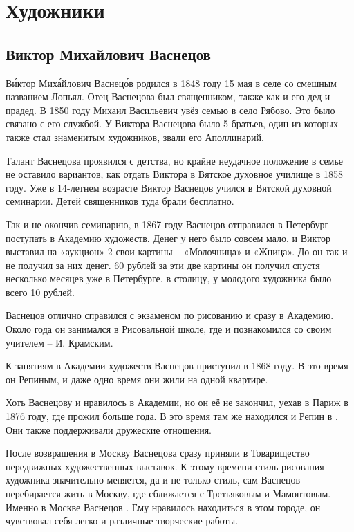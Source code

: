 \newpage
\section{Художники}
\subsection{Виктор Михайлович Васнецов}
В\'{и}ктор Мих\'{а}йлович Васнец\'{о}в родился в 1848 году 15 мая в селе со смешным названием Лопьял. Отец Васнецова был священником, также как и его дед и прадед. В 1850 году Михаил Васильевич увёз семью в село Рябово. Это было связано с его службой. У Виктора Васнецова было 5 братьев, один из которых также стал знаменитым художников, звали его Аполлинарий.

Талант Васнецова проявился с детства, но крайне неудачное  положение в семье не оставило вариантов, как отдать Виктора в Вятское духовное училище в 1858 году. Уже в 14-летнем возрасте Виктор Васнецов учился в Вятской духовной семинарии. Детей священников туда брали бесплатно.

Так и не окончив семинарию, в 1867 году Васнецов отправился в Петербург поступать в Академию художеств. Денег у него было совсем мало, и Виктор выставил на «аукцион» 2 свои картины -- «Молочница» и «Жница». До  он так и не получил за них денег. 60 рублей за эти две картины он получил спустя несколько месяцев уже в Петербурге.  в столицу, у молодого художника было всего 10 рублей.

Васнецов отлично справился с экзаменом по рисованию и сразу  в Академию. Около года он занимался в Рисовальной школе, где и познакомился со своим учителем -- И. Крамским.

К занятиям в Академии художеств Васнецов приступил в 1868 году. В это время он  Репиным, и даже одно время они жили на одной квартире.

Хоть Васнецову и нравилось в Академии, но он её не закончил, уехав в Париж в 1876 году, где прожил больше года. В это время там же находился и Репин в . Они также поддерживали дружеские отношения.

После возвращения в Москву Васнецова сразу приняли в Товарищество передвижных художественных выставок. К этому времени стиль рисования художника значительно меняется, да и не только стиль, сам Васнецов перебирается жить в Москву, где сближается с Третьяковым и Мамонтовым. Именно в Москве Васнецов . Ему нравилось находиться в этом городе, он чувствовал себя легко и  различные творческие работы.

